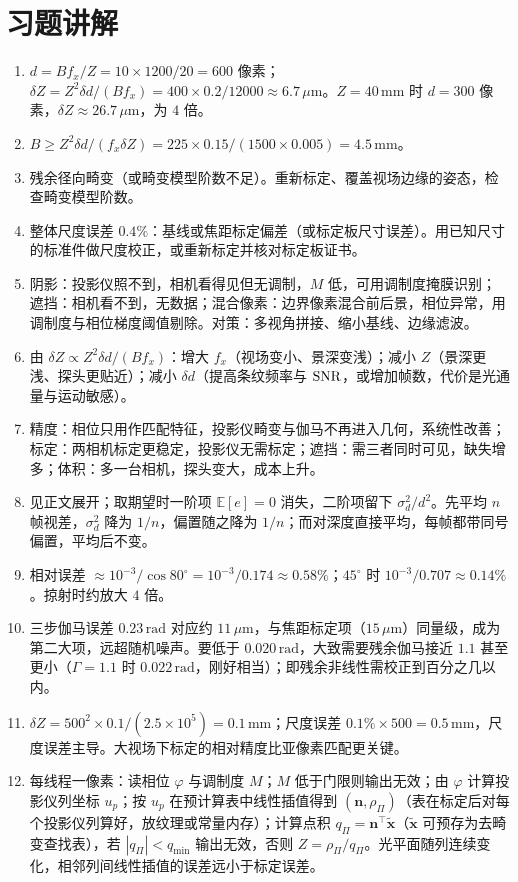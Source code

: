 \section{习题讲解}
\label{sec:ch07-solutions}

\begin{enumerate}
  \item $d=Bf_x/Z=10\times1200/20=600$ 像素；$\delta Z=Z^2\delta d/(Bf_x)=400\times0.2/12000\approx6.7\,\mu\mathrm{m}$。$Z=40\,\mathrm{mm}$ 时 $d=300$ 像素，$\delta Z\approx26.7\,\mu\mathrm{m}$，为 $4$ 倍。
  \item $B\ge Z^2\delta d/(f_x\delta Z)=225\times0.15/(1500\times0.005)=4.5\,\mathrm{mm}$。
  \item 残余径向畸变（或畸变模型阶数不足）。重新标定、覆盖视场边缘的姿态，检查畸变模型阶数。
  \item 整体尺度误差 $0.4\%$：基线或焦距标定偏差（或标定板尺寸误差）。用已知尺寸的标准件做尺度校正，或重新标定并核对标定板证书。
  \item 阴影：投影仪照不到，相机看得见但无调制，$M$ 低，可用调制度掩膜识别；遮挡：相机看不到，无数据；混合像素：边界像素混合前后景，相位异常，用调制度与相位梯度阈值剔除。对策：多视角拼接、缩小基线、边缘滤波。
  \item 由 $\delta Z\propto Z^2\delta d/(Bf_x)$：增大 $f_x$（视场变小、景深变浅）；减小 $Z$（景深更浅、探头更贴近）；减小 $\delta d$（提高条纹频率与 $\mathrm{SNR}$，或增加帧数，代价是光通量与运动敏感）。
  \item 精度：相位只用作匹配特征，投影仪畸变与伽马不再进入几何，系统性改善；标定：两相机标定更稳定，投影仪无需标定；遮挡：需三者同时可见，缺失增多；体积：多一台相机，探头变大，成本上升。
  \item 见正文展开；取期望时一阶项 $\mathbb E[e]=0$ 消失，二阶项留下 $\sigma_d^2/d^2$。先平均 $n$ 帧视差，$\sigma_d^2$ 降为 $1/n$，偏置随之降为 $1/n$；而对深度直接平均，每帧都带同号偏置，平均后不变。
  \item 相对误差 $\approx10^{-3}/\cos80^\circ=10^{-3}/0.174\approx0.58\%$；$45^\circ$ 时 $10^{-3}/0.707\approx0.14\%$。掠射时约放大 $4$ 倍。
  \item 三步伽马误差 $0.23\,\mathrm{rad}$ 对应约 $11\,\mu\mathrm{m}$，与焦距标定项（$15\,\mu\mathrm{m}$）同量级，成为第二大项，远超随机噪声。要低于 $0.020\,\mathrm{rad}$，大致需要残余伽马接近 $1.1$ 甚至更小（$\Gamma=1.1$ 时 $0.022\,\mathrm{rad}$，刚好相当）；即残余非线性需校正到百分之几以内。
  \item $\delta Z=500^2\times0.1/(2.5\times10^5)=0.1\,\mathrm{mm}$；尺度误差 $0.1\%\times500=0.5\,\mathrm{mm}$，尺度误差主导。大视场下标定的相对精度比亚像素匹配更关键。
  \item 每线程一像素：读相位 $\varphi$ 与调制度 $M$；$M$ 低于门限则输出无效；由 $\varphi$ 计算投影仪列坐标 $u_p$；按 $u_p$ 在预计算表中线性插值得到 $(\boldsymbol n,\rho_\Pi)$（表在标定后对每个投影仪列算好，放纹理或常量内存）；计算点积 $q_\Pi=\boldsymbol n^\top\tilde{\boldsymbol x}$（$\tilde{\boldsymbol x}$ 可预存为去畸变查找表），若 $|q_\Pi|<q_{\min}$ 输出无效，否则 $Z=\rho_\Pi/q_\Pi$。光平面随列连续变化，相邻列间线性插值的误差远小于标定误差。
\end{enumerate}
